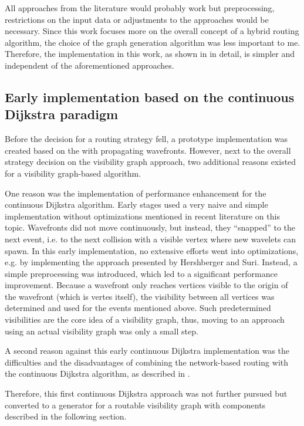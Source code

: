 		All approaches from the literature would probably work but preprocessing, restrictions on the input data or adjustments to the approaches would be necessary.
		Since this work focuses more on the overall concept of a hybrid routing algorithm, the choice of the graph generation algorithm was less important to me.
		Therefore, the implementation in this work, as shown in  in detail, is simpler and independent of the aforementioned approaches.
		
	\subsection{Early implementation based on the continuous Dijkstra paradigm}
		
		Before the decision for a routing strategy fell, a prototype implementation was created based on the  with propagating wavefronts.
		However, next to the overall strategy decision on the visibility graph approach, two additional reasons existed for a visibility graph-based algorithm.
		
		One reason was the implementation of performance enhancement for the continuous Dijkstra algorithm.
		Early stages used a very naive and simple implementation without optimizations mentioned in recent literature on this topic.
		Wavefronts did not move continuously, but instead, they \enquote{snapped} to the next event, i.e. to the next collision with a visible vertex where new wavelets can spawn.
		In this early implementation, no extensive efforts went into optimizations, e.g. by implementing the approach presented by Hershberger and Suri\cite{hershberger-suri}.
		Instead, a simple preprocessing was introduced, which led to a significant performance improvement.
		Because a wavefront only reaches vertices visible to the origin of the wavefront (which is vertes itself), the visibility between all vertices was determined and used for the events mentioned above.
		Such predetermined visibilities are the core idea of a visibility graph, thus, moving to an approach using an actual visibility graph was only a small step.
		
		A second reason against this early continuous Dijkstra implementation was the difficulties and the disadvantages of combining the network-based routing with the continuous Dijkstra algorithm, as described in .
		
		Therefore, this first continuous Dijkstra approach was not further pursued but converted to a generator for a routable visibility graph with components described in the following section.
	
